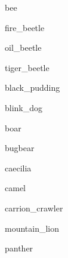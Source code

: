 \documentclass[letterpaper,serif]{module}
\begin{document}
\begin{newmonster}{bee}\end{newmonster}


\begin{newmonster}{fire_beetle}\end{newmonster}

\begin{newmonster}{oil_beetle}\end{newmonster}

\begin{newmonster}{tiger_beetle}\end{newmonster}

\begin{newmonster}{black_pudding}\end{newmonster}

\begin{newmonster}{blink_dog}\end{newmonster}

\begin{newmonster}{boar}\end{newmonster}

\begin{newmonster}{bugbear}\end{newmonster}

\begin{newmonster}{caecilia}\end{newmonster}

\begin{newmonster}{camel}\end{newmonster}

\begin{newmonster}{carrion_crawler}\end{newmonster}


\begin{newmonster}{mountain_lion}\end{newmonster}

\begin{newmonster}{panther}\end{newmonster}
\end{document}
